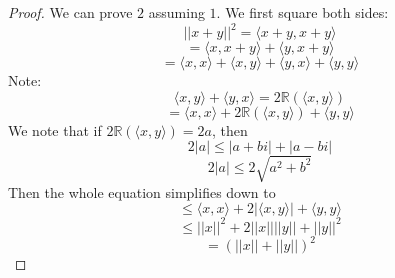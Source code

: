 \documentclass{article}
\newtheorem{one minute paper}[theorem]{One Minute Paper}
\begin{document}
\begin{proof}
    We can prove $2$ assuming $1$. We first square both sides:
    \begin{equation}
        ||x + y||^2 = \langle x + y, x + y \rangle 
    \end{equation}
    \begin{equation}
        = \langle x, x+y \rangle + \langle y, x + y \rangle
    \end{equation}
    \begin{equation}
        = \langle x, x \rangle + \langle x, y \rangle + \langle y,x \rangle + \langle y,y \rangle 
    \end{equation}
    Note:
    \begin{equation}
        \langle x,y \rangle + \langle y,x \rangle = 2\mathbb{R}(\langle x,y \rangle)
    \end{equation}
    \begin{equation}
        = \langle x,x \rangle + 2\mathbb{R}(\langle x,y \rangle) + \langle y,y \rangle 
    \end{equation}
    We note that if $2\mathbb{R}(\langle x,y \rangle) = 2a$, then 
    \begin{equation}
        2|a| \leq |a + bi| + |a-bi|
    \end{equation}
    \begin{equation}
        2|a| \leq 2\sqrt{a^2 + b^2}
    \end{equation}
    Then the whole equation simplifies down to 
    \begin{equation}
        \leq \langle x,x \rangle + 2|\langle x,y \rangle| + \langle y,y \rangle 
    \end{equation}
    \begin{equation}
        \leq ||x||^2 + 2||x|| ||y|| + ||y||^2
    \end{equation}
    \begin{equation}
        = (||x|| + ||y||)^2
    \end{equation}
\end{proof}
\end{document}
